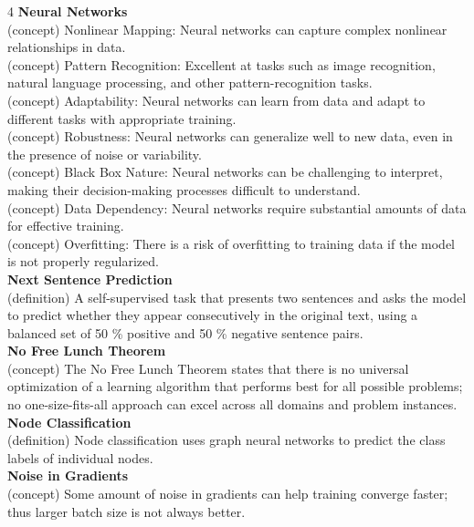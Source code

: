 \documentclass[8pt]{extarticle}
\begin{document}
\begin{multicols}{4}
{\vspace{2pt}\textbf{Neural Networks}\\
(concept) Nonlinear Mapping: Neural networks can capture complex nonlinear relationships in data.\\
(concept) Pattern Recognition: Excellent at tasks such as image recognition, natural language processing, and other pattern-recognition tasks.\\
(concept) Adaptability: Neural networks can learn from data and adapt to different tasks with appropriate training.\\
(concept) Robustness: Neural networks can generalize well to new data, even in the presence of noise or variability.\\
(concept) Black Box Nature: Neural networks can be challenging to interpret, making their decision-making processes difficult to understand.\\
(concept) Data Dependency: Neural networks require substantial amounts of data for effective training.\\
(concept) Overfitting: There is a risk of overfitting to training data if the model is not properly regularized.\\
\vspace{2pt}\textbf{Next Sentence Prediction}\\
(definition) A self-supervised task that presents two sentences and asks the model to predict whether they appear consecutively in the original text, using a balanced set of 50 \% positive and 50 \% negative sentence pairs.\\
\vspace{2pt}\textbf{No Free Lunch Theorem}\\
(concept) The No Free Lunch Theorem states that there is no universal optimization of a learning algorithm that performs best for all possible problems; no one-size-fits-all approach can excel across all domains and problem instances.\\
\vspace{2pt}\textbf{Node Classification}\\
(definition) Node classification uses graph neural networks to predict the class labels of individual nodes.\\
\vspace{2pt}\textbf{Noise in Gradients}\\
(concept) Some amount of noise in gradients can help training converge faster; thus larger batch size is not always better.\\
}
\end{multicols}
\end{document}
